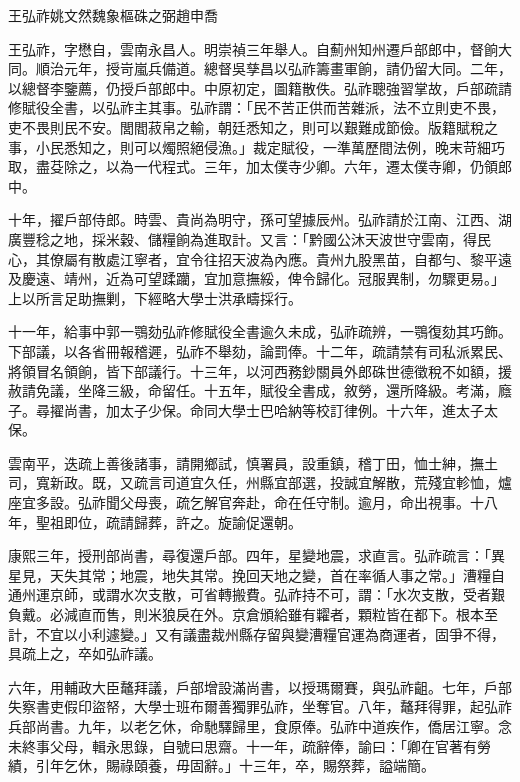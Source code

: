 
\begin{pinyinscope}
王弘祚姚文然魏象樞硃之弼趙申喬

王弘祚，字懋自，雲南永昌人。明崇禎三年舉人。自薊州知州遷戶部郎中，督餉大同。順治元年，授岢嵐兵備道。總督吳孳昌以弘祚籌畫軍餉，請仍留大同。二年，以總督李鑒薦，仍授戶部郎中。中原初定，圖籍散佚。弘祚聰強習掌故，戶部疏請修賦役全書，以弘祚主其事。弘祚謂：「民不苦正供而苦雜派，法不立則吏不畏，吏不畏則民不安。閭閻菽帛之輸，朝廷悉知之，則可以艱難成節儉。版籍賦稅之事，小民悉知之，則可以燭照絕侵漁。」裁定賦役，一準萬歷間法例，晚末苛細巧取，盡芟除之，以為一代程式。三年，加太僕寺少卿。六年，遷太僕寺卿，仍領郎中。

十年，擢戶部侍郎。時雲、貴尚為明守，孫可望據辰州。弘祚請於江南、江西、湖廣豐稔之地，採米穀、儲糧餉為進取計。又言：「黔國公沐天波世守雲南，得民心，其僚屬有散處江寧者，宜令往招天波為內應。貴州九股黑苗，自都勻、黎平遠及慶遠、靖州，近為可望蹂躪，宜加意撫綏，俾令歸化。冠服異制，勿驟更易。」上以所言足助撫剿，下經略大學士洪承疇採行。

十一年，給事中郭一鶚劾弘祚修賦役全書逾久未成，弘祚疏辨，一鶚復劾其巧飾。下部議，以各省冊報稽遲，弘祚不舉劾，論罰俸。十二年，疏請禁有司私派累民、將領冒名領餉，皆下部議行。十三年，以河西務鈔關員外郎硃世德徵稅不如額，援赦請免議，坐降三級，命留任。十五年，賦役全書成，敘勞，還所降級。考滿，廕子。尋擢尚書，加太子少保。命同大學士巴哈納等校訂律例。十六年，進太子太保。

雲南平，迭疏上善後諸事，請開鄉試，慎署員，設重鎮，稽丁田，恤士紳，撫土司，寬新政。既，又疏言司道宜久任，州縣宜部選，投誠宜解散，荒殘宜軫恤，爐座宜多設。弘祚聞父母喪，疏乞解官奔赴，命在任守制。逾月，命出視事。十八年，聖祖即位，疏請歸葬，許之。旋諭促還朝。

康熙三年，授刑部尚書，尋復還戶部。四年，星變地震，求直言。弘祚疏言：「異星見，天失其常；地震，地失其常。挽回天地之變，首在率循人事之常。」漕糧自通州運京師，或謂水次支散，可省轉搬費。弘祚持不可，謂：「水次支散，受者艱負戴。必減直而售，則米狼戾在外。京倉頒給雖有糶者，顆粒皆在都下。根本至計，不宜以小利遽變。」又有議盡裁州縣存留與變漕糧官運為商運者，固爭不得，具疏上之，卒如弘祚議。

六年，用輔政大臣鼇拜議，戶部增設滿尚書，以授瑪爾賽，與弘祚齟。七年，戶部失察書吏假印盜帑，大學士班布爾善獨罪弘祚，坐奪官。八年，鼇拜得罪，起弘祚兵部尚書。九年，以老乞休，命馳驛歸里，食原俸。弘祚中道疾作，僑居江寧。念未終事父母，輯永思錄，自號曰思齋。十一年，疏辭俸，諭曰：「卿在官著有勞績，引年乞休，賜祿頤養，毋固辭。」十三年，卒，賜祭葬，謚端簡。


\end{pinyinscope}
